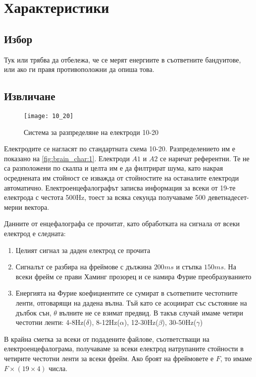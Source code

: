 \documentclass[main.tex]{subfiles}
\begin{document}
\section{Характеристики}
\subsection{Избор}
Тук или трябва да отбележа, че се мерят енергиите в съответните бандуитове, или
ако ги правя противоположни да опиша това.
\subsection{Извличане}

\begin{minipage}{0.45\textwidth}
        \begin{figure}[H]
                \texttt{[image: 10\_20]}
                \caption{Система за разпределяне на електроди 10-20}
                \label{fig:brain_char:1}
        \end{figure}
\end{minipage} \hfill
\begin{minipage}{0.45\textwidth}
        Електродите се нагласят по стандартната схема 10-20. Разпределението им е показано на \autoref{fig:brain_char:1}. Електроди $A1$ и $A2$ се наричат референтни. Те не са разположени по скалпа и целта им е да филтрират шума, като накрая осреднената им стойност се изважда от стойностите на останалите електроди автоматично. Електроенцефалографът записва информация за всеки от 19-те електрода с честота 500Hz, тоест за всяка секунда получаваме 500 деветнадесет-мерни вектора.
\end{minipage}
Данните от енцефалографа се прочитат, като обработката на сигнала от всеки електрод е следната:
\begin{enumerate}
        \item Целият сигнал за даден електрод се прочита
        \item Сигналът се разбира на фреймове с дължина $200ms$ и стъпка $150ms$. На всеки фрейм се прави Хаминг прозорец и се намира Фурие преобразуванието
        \item Енергията на Фурие коефициентите се сумират в съответните честотните ленти, отговарящи на дадена вълна. Тъй като се асоциират със състояние на дълбок сън, $\theta$ вълните не се взимат предвид. В такъв случай имаме четири честотни ленти: 4-8Hz($\delta$), 8-12Hz($\alpha$), 12-30Hz($\beta$), 30-50Hz($\gamma$)
\end{enumerate}
В крайна сметка за всеки от подадените файлове, съответстващи на електроенцефалограма, получаваме за всеки електрод натрупаните стойности в четирите честотни ленти за всеки фрейм. Ако броят на фреймовете е $F$, то имаме $F\times (19\times4)$ числа.
\end{document}

